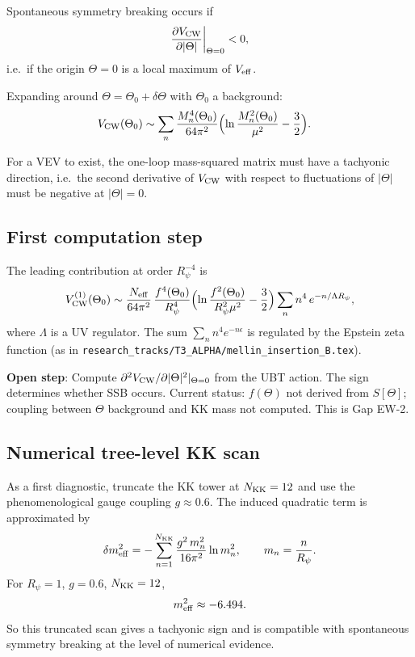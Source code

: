 \documentclass[12pt,a4paper]{article}
\begin{document}
Spontaneous symmetry breaking occurs if
\[
  \frac{\partial V_{\rm CW}}{\partial |\Theta|}\bigg|_{\Theta=0} < 0,
\]
i.e.\ if the origin $\Theta = 0$ is a local maximum of $V_{\rm eff}$.

Expanding around $\Theta = \Theta_0 + \delta\Theta$ with $\Theta_0$ a background:
\begin{align}
  V_{\rm CW}(\Theta_0) &\sim
  \sum_n \frac{M_n^4(\Theta_0)}{64\pi^2}
  \Bigl(\ln\frac{M_n^2(\Theta_0)}{\mu^2} - \frac{3}{2}\Bigr).
\end{align}

For a VEV to exist, the one-loop mass-squared matrix must have a tachyonic
direction, i.e.\ the second derivative of $V_{\rm CW}$ with respect to
fluctuations of $|\Theta|$ must be negative at $|\Theta|=0$.

\subsection{First computation step}

The leading contribution at order $R_\psi^{-4}$ is
\[
  V_{\rm CW}^{(1)}(\Theta_0) \sim
  \frac{N_{\rm eff}}{64\pi^2}\,
  \frac{f^4(\Theta_0)}{R_\psi^4}
  \Bigl(\ln\frac{f^2(\Theta_0)}{R_\psi^2 \mu^2} - \frac{3}{2}\Bigr)
  \sum_n n^4\,e^{-n/\Lambda R_\psi},
\]
where $\Lambda$ is a UV regulator.
The sum $\sum_n n^4 e^{-n\epsilon}$ is regulated by the Epstein zeta function
(as in \texttt{research\_tracks/T3\_ALPHA/mellin\_insertion\_B.tex}).

\begin{openproblembox}
\textbf{Open step}: Compute $\partial^2 V_{\rm CW}/\partial|\Theta|^2|_{\Theta=0}$
from the UBT action.  The sign determines whether SSB occurs.
Current status: $f(\Theta)$ not derived from $S[\Theta]$; coupling between
$\Theta$ background and KK mass not computed.
This is Gap EW-2.
\end{openproblembox}

\subsection{Numerical tree-level KK scan}

As a first diagnostic, truncate the KK tower at \(N_{\rm KK}=12\) and use
the phenomenological gauge coupling \(g\approx0.6\).  The induced quadratic
term is approximated by
\[
\delta m_{\rm eff}^2
=-\sum_{n=1}^{N_{\rm KK}}
\frac{g^2\,m_n^2}{16\pi^2}\ln m_n^2,
\qquad m_n=\frac{n}{R_\psi}.
\]
For \(R_\psi=1\), \(g=0.6\), \(N_{\rm KK}=12\),
\[
m_{\rm eff}^2 \approx -6.494.
\]
So this truncated scan gives a tachyonic sign and is compatible with
spontaneous symmetry breaking at the level of numerical evidence.
\end{document}
